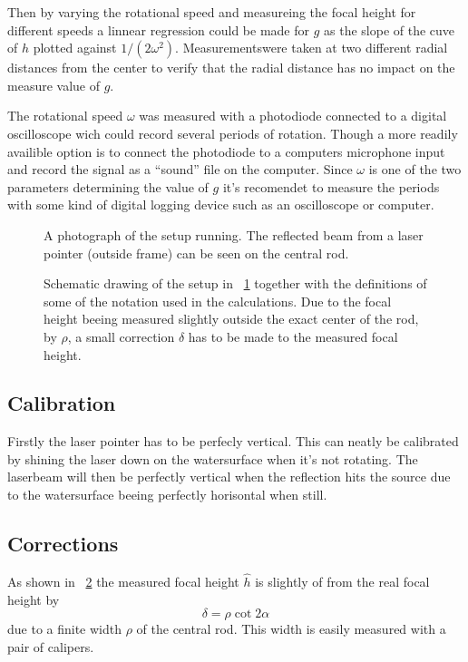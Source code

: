 \documentclass[11pt,towcolumn, swedish, english]{article}
\newcommand{\figref}{\figurename~\ref}
\begin{document}
Then by varying the rotational speed and measureing the focal height for
different speeds a linnear regression could be made for $g$ as the
slope of the cuve of $h$ plotted against $1/(2\omega^2)$. 
Measurementswere taken at two different radial distances from the
center to verify that the radial distance has no impact on the measure
value of $g$. 

The rotational speed $\omega$ was measured with a photodiode connected
to a digital oscilloscope wich could record several periods of
rotation. Though a more readily availible option is to connect the
photodiode to a computers microphone input and record the signal as a
``sound'' file on the computer. Since $\omega$ is one of the two
parameters determining the value of $g$ it's recomendet to measure the
periods with some kind of digital logging device such as an
oscilloscope or computer. 

\begin{figure}
\centering
\resizebox{0.8\linewidth}{!}{}
\caption{\label{fig:rot_bowl_pic} A photograph of the setup running. The
  reflected beam from a laser pointer (outside frame) can be seen on
  the central rod. } 
\end{figure}

\begin{figure}\centering
\resizebox{.6\linewidth}{!}{}
\caption{\label{fig:rot_bowl} Schematic drawing of the setup in
  \figref{fig:rot_bowl_pic} together with the definitions of some of
  the notation used in the calculations. Due to the focal height
  beeing measured slightly outside the exact center of the rod, by
  $\rho$, a small correction $\delta$ has to be made to the measured
  focal height. }
\end{figure}

\subsection{Calibration}
Firstly the laser pointer has to be perfecly vertical. This can neatly be
calibrated by shining the laser down on the watersurface when it's not
rotating. The laserbeam will then be perfectly vertical when the
reflection hits the source due to the watersurface beeing perfectly
horisontal when still.



\subsection{Corrections}
As shown in \figref{fig:rot_bowl} the measured focal height
$\hat{h}$ is slightly of from the real focal height by 
\begin{equation*}%
\delta=\rho\cot 2\alpha
\end{equation*}
due to a finite width $\rho$ of the central rod. This width is easily
measured with a pair of calipers.
\end{document}
